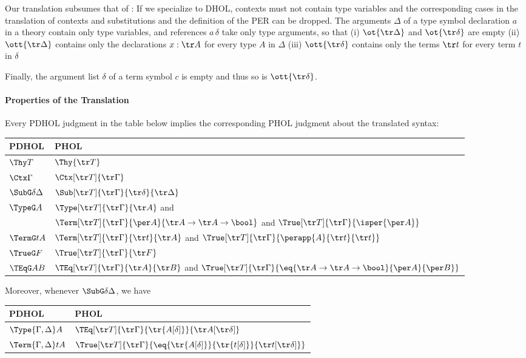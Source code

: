 Our translation subsumes that of \cite{RRB23ext}: If we specialize to DHOL,
contexts must not contain type variables and the corresponding cases in the translation of contexts and substitutions and the definition of the PER can be dropped.
The arguments $\Delta$ of a type symbol declaration $a$ in a theory contain only type
variables, and references $a\,\delta$ take only type arguments, so that (i) $\ot{\tr\Delta}$
and $\ot{\tr\delta}$ are empty (ii) $\ott{\tr\Delta}$ contains only the declarations $x:\tr A$
for every type $A$ in $\Delta$ (iii) $\ott{\tr\delta}$ contains only the terms $\tr t$ for every term $t$ in $\delta$

Finally, the argument list $\delta$ of a term symbol $c$ is empty and thus so is $\ott{\tr\delta}$.

\paragraph*{Properties of the Translation}\label{sec:meta}
\begin{theorem}\label{thm:preserve}
Every PDHOL judgment in the table below implies the corresponding PHOL judgment about the translated syntax:
\begin{center}
	\begin{tabular}{|l|l|}
		\hline 
		PDHOL & PHOL \\ 
		\hline
		$\Thy T$ & $\Thy {\tr T}$\\
		$\Ctx \Gamma$ & $\Ctx[\tr T]{\tr\Gamma}$\\
		$\SubG \delta \Delta$ & $\Sub[\tr T]{\tr\Gamma}{\tr\delta}{\tr\Delta}$\\
		$\TypeG A$ & $\Type[\tr T]{\tr\Gamma}{\tr A}$ and \\
		   & \quad $\Term[\tr T]{\tr\Gamma}{\per A}{\tr A\to\tr A\to\bool}$ and $\True[\tr T]{\tr\Gamma}{\isper{\per A}}$\\ 
		$\TermG tA$ & $\Term[\tr T]{\tr\Gamma}{\tr t}{\tr A}$ and $\True[\tr T]{\tr\Gamma}{\perapp{A}{\tr t}{\tr t}}$\\
		$\TrueG F$ & $\True[\tr T]{\tr\Gamma}{\tr F}$ \\
		$\TEqG AB$ & $\TEq[\tr T]{\tr\Gamma}{\tr A}{\tr B}$ and  $\True[\tr T]{\tr\Gamma}{\eq{\tr A\to\tr A\to\bool}{\per A}{\per B}}$\\ 
		\hline
	\end{tabular}
 \end{center}
 
Moreover, whenever $\SubG \delta \Delta$, we have
\begin{center}
	\begin{tabular}{|l|l|}
		\hline 
		PDHOL & PHOL \\ 
		\hline
		$\Type{\Gamma,\Delta}A$ & $\TEq[\tr T]{\tr\Gamma}{\tr{A[\delta]}}{{\tr A}[{\tr\delta}]}$ \\
		$\Term{\Gamma,\Delta}tA$ & $\True[\tr T]{\tr\Gamma}{\eq{\tr{A[\delta]}}{\tr{t[\delta]}}{{\tr t}[\tr\delta]}}$\\ 
		\hline
	\end{tabular}
\end{center}
\end{theorem}

